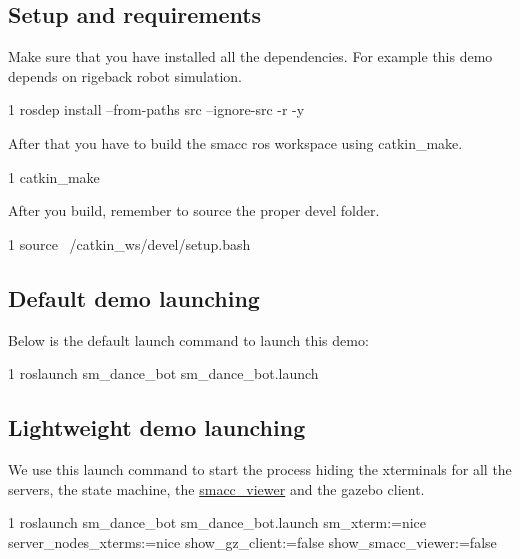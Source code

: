 \subsection*{Setup and requirements}

Make sure that you have installed all the dependencies. For example this demo depends on rigeback robot simulation.


\begin{DoxyCode}
1 rosdep install --from-paths src --ignore-src -r -y 
\end{DoxyCode}


After that you have to build the smacc ros workspace using catkin\+\_\+make.


\begin{DoxyCode}
1 catkin\_make
\end{DoxyCode}


After you build, remember to source the proper devel folder.


\begin{DoxyCode}
1 source ~/catkin\_ws/devel/setup.bash
\end{DoxyCode}


\subsection*{Default demo launching}

Below is the default launch command to launch this demo\+:


\begin{DoxyCode}
1 roslaunch sm\_dance\_bot sm\_dance\_bot.launch
\end{DoxyCode}


\subsection*{Lightweight demo launching}

We use this launch command to start the process hiding the xterminals for all the servers, the state machine, the \hyperlink{namespacesmacc__viewer}{smacc\+\_\+viewer} and the gazebo client.


\begin{DoxyCode}
1 roslaunch sm\_dance\_bot sm\_dance\_bot.launch sm\_xterm:=nice server\_nodes\_xterms:=nice show\_gz\_client:=false
       show\_smacc\_viewer:=false
\end{DoxyCode}
 